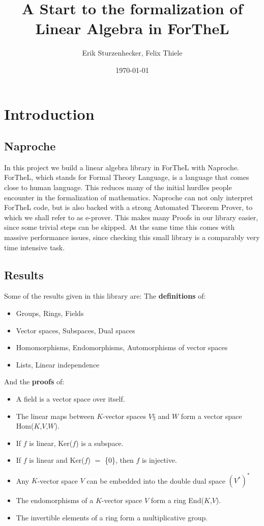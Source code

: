 \documentclass[11pt]{article}
\author{Erik Sturzenhecker, Felix Thiele}
\title{A Start to the formalization of Linear Algebra in ForTheL}
\date{\today}
\begin{document}
\maketitle

\newpage 
\setcounter{tocdepth}{10}
\tableofcontents


\newpage 
\section{Introduction}
\subsection{Naproche}
In this project we build a linear algebra library in ForTheL with Naproche. ForTheL, which stands for Formal Theory Language, is a language that comes close to human language. This reduces many of the initial hurdles people encounter in the formalization of mathematics. Naproche can not only interpret ForTheL code, but is also backed with a strong Automated Theorem Prover, to which we shall refer to as e-prover. This makes many Proofs in our library easier, since some trivial steps can be skipped. At the same time this comes with massive performance issues, since checking this small library is a comparably very time intensive task.

\subsection{Results}
Some of the results given in this library are:
\newline
The \textbf{definitions} of:
\begin{itemize}[nolistsep, noitemsep]
\item Groups, Rings, Fields
\item Vector spaces, Subspaces, Dual spaces
\item Homomorphisms, Endomorphisms, Automorphisms of vector spaces
\item Lists, Linear independence
\end{itemize}
And the \textbf{proofs} of:
\begin{itemize}[nolistsep, noitemsep]
\item A field is a vector space over itself.
\item The linear maps between $K$-vector spaces $V§$ and $W$ form a vector space Hom($K$,$V$,$W$).
\item If $f$ is linear, Ker($f$) is a subspace.
\item If $f$ is linear and Ker($f$) $=$ \{0\}, then $f$ is injective.
\item Any $K$-vector space $V$ can be embedded into the double dual space $(V^{*})^{*}$
\item The endomorphisms of a $K$-vector space $V$ form a ring End($K$,$V$).
\item The invertible elements of a ring form a multiplicative group.
\end{itemize}
\end{document}

